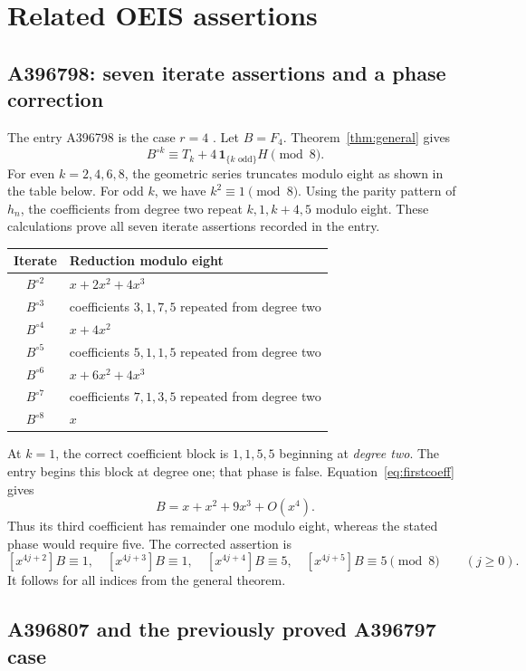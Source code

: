 \documentclass[11pt,a4paper]{article}
\theoremstyle{remark}
\newcommand{\coeff}[2]{[x^{#1}]#2}
\begin{document}
\section{Related OEIS assertions}

\subsection{A396798: seven iterate assertions and a phase correction}

The entry A396798 is the case $r=4$ \cite{oeis798}. Let $B=F_4$.
Theorem~\ref{thm:general} gives
\[
B^{\circ k}\equiv T_k+4\,\mathbf1_{\{k\text{ odd}\}}H\pmod8.
\]
For even $k=2,4,6,8$, the geometric series truncates modulo eight
as shown in the table below. For odd $k$, we have $k^2\equiv1\pmod8$.
Using the parity pattern of $h_n$, the coefficients from degree two
repeat $k,1,k+4,5$ modulo eight. These calculations prove all seven
iterate assertions recorded in the entry.

\begin{center}
\begin{tabular}{@{}cl@{}}
\toprule
Iterate & Reduction modulo eight\\
\midrule
$B^{\circ2}$ & $x+2x^2+4x^3$\\
$B^{\circ3}$ & coefficients $3,1,7,5$ repeated from degree two\\
$B^{\circ4}$ & $x+4x^2$\\
$B^{\circ5}$ & coefficients $5,1,1,5$ repeated from degree two\\
$B^{\circ6}$ & $x+6x^2+4x^3$\\
$B^{\circ7}$ & coefficients $7,1,3,5$ repeated from degree two\\
$B^{\circ8}$ & $x$\\
\bottomrule
\end{tabular}
\end{center}

At $k=1$, the correct coefficient block is $1,1,5,5$ beginning
at \emph{degree two}. The entry begins this block at degree one;
that phase is false. Equation~\eqref{eq:firstcoeff} gives
\[
B=x+x^2+9x^3+O(x^4).
\]
Thus its third coefficient has remainder one modulo eight, whereas
the stated phase would require five. The corrected assertion is
\[
\coeff{4j+2}{B}\equiv1,\quad
\coeff{4j+3}{B}\equiv1,\quad
\coeff{4j+4}{B}\equiv5,\quad
\coeff{4j+5}{B}\equiv5\pmod8
\qquad(j\ge0).
\]
It follows for all indices from the general theorem.

\subsection{A396807 and the previously proved A396797 case}
\end{document}
